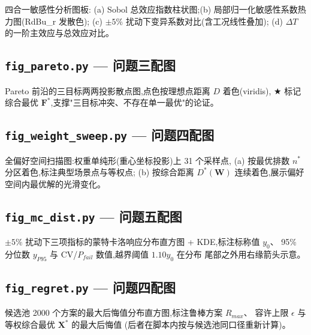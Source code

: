 四合一敏感性分析图板:
(a) Sobol 总效应指数柱状图;(b) 局部归一化敏感性系数热力图(RdBu\_r 发散色);
(c) $\pm5\%$ 扰动下变异系数对比(含工况线性叠加);
(d) $\Delta T$ 的一阶主效应与总效应对比。



\newpage
\subsection{\texttt{fig\_pareto.py} — 问题三配图}

Pareto 前沿的三目标两两投影散点图,点色按理想点距离 $D$ 着色(viridis),
$\bigstar$ 标记综合最优 $\mathbf{F}^*$,支撑"三目标冲突、不存在单一最优"的论证。



\newpage
\subsection{\texttt{fig\_weight\_sweep.py} — 问题四配图}

全偏好空间扫描图:权重单纯形(重心坐标投影)上 31 个采样点,
(a) 按最优排数 $n^*$ 分区着色,标注典型场景点与等权点;
(b) 按综合距离 $D^*(\mathbf{W})$ 连续着色,展示偏好空间内最优解的光滑变化。



\newpage
\subsection{\texttt{fig\_mc\_dist.py} — 问题五配图}

$\pm 5\%$ 扰动下三项指标的蒙特卡洛响应分布直方图 + KDE,标注标称值 $y_0$、
95\% 分位数 $y_{P95}$ 与 CV/$P_{fail}$ 数值,越界阈值 $1.10y_0$ 在分布
尾部之外用右缘箭头示意。



\newpage
\subsection{\texttt{fig\_regret.py} — 问题四配图}

候选池 2000 个方案的最大后悔值分布直方图,标注鲁棒方案 $R_{max}$、
容许上限 $\epsilon$ 与等权综合最优 $\mathbf{X}^*$ 的最大后悔值
(后者在脚本内按与候选池同口径重新计算)。


